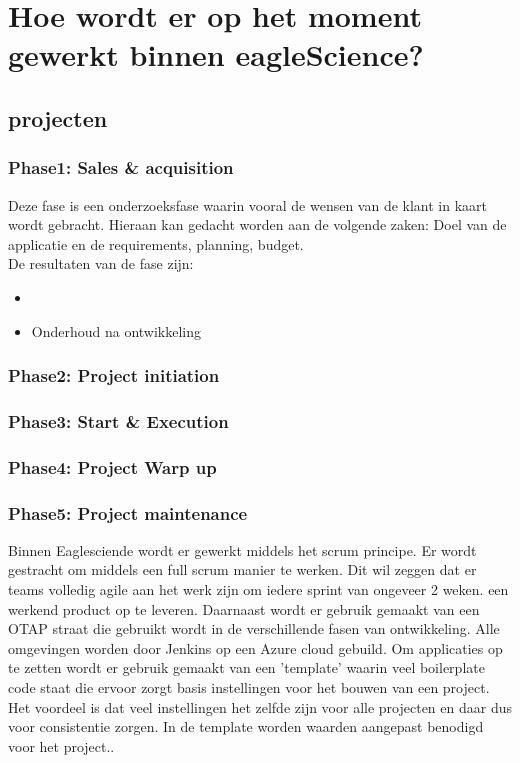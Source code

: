 \section{Hoe wordt er op het moment gewerkt binnen eagleScience?}
\subsection{projecten}
\subsubsection{Phase1: Sales \& acquisition}
Deze fase is een onderzoeksfase waarin vooral de wensen van de klant in kaart wordt gebracht. Hieraan kan gedacht worden aan de volgende zaken: Doel van de applicatie en de requirements, planning, budget.\\
De resultaten van de fase zijn: \\
\begin{itemize}
\item
\item Onderhoud na ontwikkeling
\end{itemize}

\subsubsection{Phase2: Project initiation}

\subsubsection{Phase3: Start \& Execution}

\subsubsection{Phase4: Project Warp up}

\subsubsection{Phase5: Project maintenance}



Binnen Eaglesciende wordt er gewerkt middels het scrum principe. Er wordt gestracht om middels een full scrum manier te werken. Dit wil zeggen dat er teams volledig agile aan het werk zijn om iedere sprint van ongeveer 2 weken. een werkend product op te leveren. Daarnaast wordt er gebruik gemaakt van een OTAP straat die gebruikt wordt in de verschillende fasen van ontwikkeling. Alle omgevingen worden door Jenkins op een Azure cloud gebuild. Om applicaties op te zetten wordt er gebruik gemaakt van een 'template' waarin veel boilerplate code staat die ervoor zorgt basis instellingen voor het bouwen van een project. Het voordeel is dat veel instellingen het zelfde zijn voor alle projecten en daar dus voor consistentie zorgen. In de template worden waarden aangepast benodigd voor het project..



